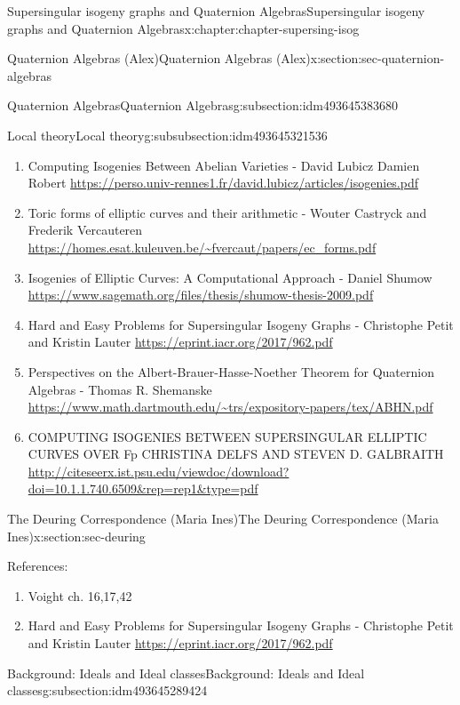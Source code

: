 \documentclass[oneside,10pt,]{book}
\numberwithin{equation}{section}
\begin{document}
\begin{chapterptx}{Supersingular isogeny graphs and Quaternion Algebras}{}{Supersingular isogeny graphs and Quaternion Algebras}{}{}{x:chapter:chapter-supersing-isog}
\begin{sectionptx}{Quaternion Algebras (Alex)}{}{Quaternion Algebras (Alex)}{}{}{x:section:sec-quaternion-algebras}
\begin{subsectionptx}{Quaternion Algebras}{}{Quaternion Algebras}{}{}{g:subsection:idm493645383680}
\begin{subsubsectionptx}{Local theory}{}{Local theory}{}{}{g:subsubsection:idm493645321536}
\begin{enumerate}
\item{}Computing Isogenies Between Abelian Varieties - David Lubicz Damien Robert \url{https://perso.univ-rennes1.fr/david.lubicz/articles/isogenies.pdf}%
\item{}Toric forms of elliptic curves and their arithmetic - Wouter Castryck and Frederik Vercauteren \url{https://homes.esat.kuleuven.be/\~fvercaut/papers/ec_forms.pdf}%
\item{}Isogenies of Elliptic Curves: A Computational Approach - Daniel Shumow \url{https://www.sagemath.org/files/thesis/shumow-thesis-2009.pdf}%
\item{}Hard and Easy Problems for Supersingular Isogeny Graphs - Christophe Petit and Kristin Lauter \url{https://eprint.iacr.org/2017/962.pdf}%
\item{}Perspectives on the Albert-Brauer-Hasse-Noether Theorem for Quaternion Algebras -  Thomas R. Shemanske \url{https://www.math.dartmouth.edu/\~trs/expository-papers/tex/ABHN.pdf}%
\item{}COMPUTING ISOGENIES BETWEEN SUPERSINGULAR ELLIPTIC CURVES OVER Fp CHRISTINA DELFS AND STEVEN D. GALBRAITH \url{http://citeseerx.ist.psu.edu/viewdoc/download?doi=10.1.1.740.6509\&rep=rep1\&type=pdf}%
\end{enumerate}
%
\end{subsubsectionptx}
\end{subsectionptx}
\end{sectionptx}
%
%
\typeout{************************************************}
\typeout{************************************************}
%
\begin{sectionptx}{The Deuring Correspondence (Maria Ines)}{}{The Deuring Correspondence (Maria Ines)}{}{}{x:section:sec-deuring}
\begin{introduction}{}%
References:%
\par
%
\begin{enumerate}
\item{}Voight ch. 16,17,42%
\item{}Hard and Easy Problems for Supersingular Isogeny Graphs - Christophe Petit and Kristin Lauter \url{https://eprint.iacr.org/2017/962.pdf}%
\end{enumerate}
%
\end{introduction}%
%
%
\typeout{************************************************}
\typeout{************************************************}
%
\begin{subsectionptx}{Background: Ideals and Ideal classes}{}{Background: Ideals and Ideal classes}{}{}{g:subsection:idm493645289424}

\end{subsectionptx}
\end{sectionptx}
\end{chapterptx}
\end{document}
